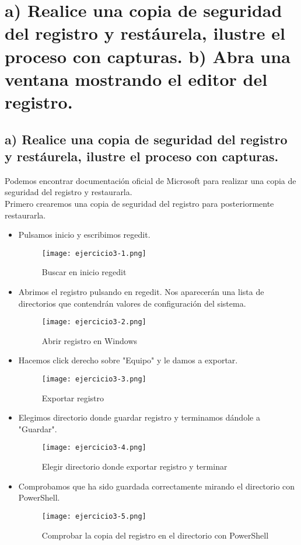 	
	\section{a) Realice una copia de seguridad del registro y restáurela, ilustre el proceso con capturas. b) Abra una ventana mostrando el editor del registro.}
	
	
	\subsection{a) Realice una copia de seguridad del registro y restáurela, ilustre el proceso con capturas.}
	
	Podemos encontrar documentación oficial de Microsoft para realizar una copia de seguridad del registro y restaurarla.\\
	
	Primero crearemos una copia de seguridad del registro para posteriormente restaurarla.
	\begin{itemize}
		\item Pulsamos inicio y escribimos regedit.
			\begin{figure}[H] 
				\centering
				\texttt{[image: ejercicio3-1.png]} 
				\label{figura12} 
				\caption{Buscar en inicio regedit}
			\end{figure}
		\item Abrimos el registro pulsando en regedit. Nos aparecerán una lista de directorios que contendrán valores de configuración del sistema.
			\begin{figure}[H] 
				\centering
				\texttt{[image: ejercicio3-2.png]} 
				\label{figura13} 
				\caption{Abrir registro en Windows}
			\end{figure}
		\item Hacemos click derecho sobre "Equipo" y le damos a exportar.
				\begin{figure}[H] 
					\centering
					\texttt{[image: ejercicio3-3.png]} 
					\label{figura14} 
					\caption{Exportar registro}
				\end{figure}
		\item Elegimos directorio donde guardar registro y terminamos dándole a "Guardar".
			\begin{figure}[H] 
				\centering
				\texttt{[image: ejercicio3-4.png]} 
				\label{figura15} 
				\caption{Elegir directorio donde exportar registro y terminar}
			\end{figure}
		\item Comprobamos que ha sido guardada correctamente mirando el directorio con PowerShell.
			\begin{figure}[H] 
				\centering
				\texttt{[image: ejercicio3-5.png]} 
				\label{figura16} 
				\caption{Comprobar la copia del registro en el directorio con PowerShell}
			\end{figure}
	\end{itemize}
	
